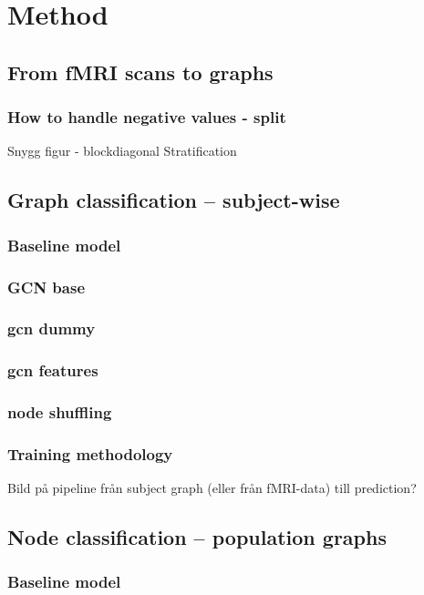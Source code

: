 \chapter{Method}

\section{From fMRI scans to graphs}
\subsection{How to handle negative values - split}
Snygg figur - blockdiagonal
Stratification

\section{Graph classification -- subject-wise}
\subsection{Baseline model}
\subsection{GCN base}
\subsection{gcn dummy}
\subsection{gcn features}
\subsection{node shuffling}
\subsection{Training methodology}
Bild på pipeline från subject graph (eller från fMRI-data) till prediction?

\section{Node classification -- population graphs}
\subsection{Baseline model}
